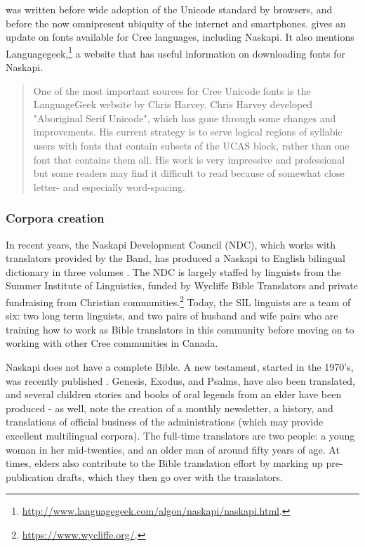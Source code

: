 \citet{jancewicz2002applied} was written before wide adoption of the Unicode standard by browsers, and before the now omnipresent ubiquity of the internet and smartphones. \citet{jancewicz2012cree} gives an update on fonts available for Cree languages, including Naskapi. It also mentions Languagegeek,\footnote{\href{http://www.languagegeek.com/algon/naskapi/naskapi.html}{http://www.languagegeek.com/algon/naskapi/naskapi.html}. } a website that has useful information on downloading fonts for Naskapi.

\begin{quote}
One of the most important sources for Cree Unicode fonts is the LanguageGeek website by Chris Harvey. Chris Harvey developed "Aboriginal Serif Unicode", which has gone through some changes and improvements. His current strategy is to serve logical regions of syllabic users with fonts that contain subsets of the UCAS block, rather than one font that contains them all. His work is very impressive and professional but some readers may find it difficult to read because of somewhat close letter- and especially word-spacing. \citep[17]{jancewicz2012cree}
\end{quote}

\subsubsection{Corpora creation}

In recent years, the Naskapi Development Council (NDC), which works with translators provided by the Band, has produced a Naskapi to English bilingual dictionary in three volumes \citep{MacKenzie-and-Jancewicz-1994}. The NDC is largely staffed by linguists from the Summer Institute of Linguistics, funded by Wycliffe Bible Translators and private fundraising from Christian communities.\footnote{\href{https://www.wycliffe.org/}{https://www.wycliffe.org/}. } Today, the SIL linguists are a team of six: two long term linguists, and two pairs of husband and wife pairs who are training how to work as Bible translators in this community before moving on to working with other Cree communities in Canada.

Naskapi does not have a complete Bible. A new testament, started in the 1970's, was recently published \citep{naskapi-new-testament}. Genesis, Exodus, and Psalms, have also been translated, and several children stories and books of oral legends from an elder have been produced - as well, \citet{jancewicz2002applied} note the creation of a monthly newsletter, a history, and translations of official business of the administrations (which may provide excellent multilingual corpora). The full-time translators are two people: a young woman in her mid-twenties, and an older man of around fifty years of age. At times, elders also contribute to the Bible translation effort by marking up pre-publication drafts, which they then go over with the translators.

